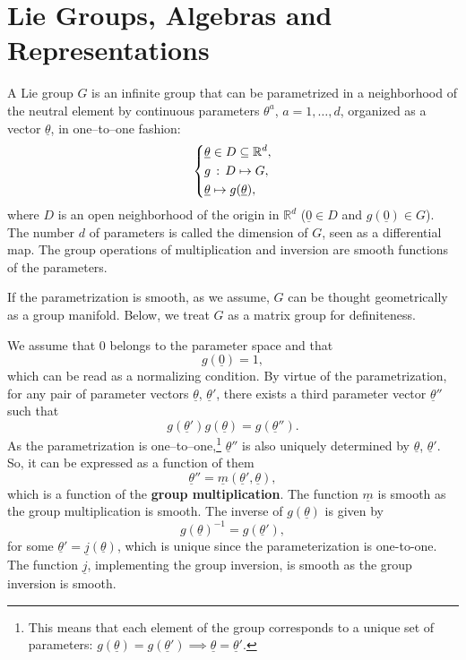 \chapter[Lie Groups, Algebras and Representations]{Lie Groups, Algebras and\\Representations} \label{sec:lie}

A Lie group \(G\) is an infinite group that can be parametrized in a neighborhood of the neutral element by continuous parameters \(\theta^a\), \(a = 1, \ldots, d\), organized as a vector \(\underline{\theta}\), in one–to–one fashion:
\[
    \begin{dcases}
        \underline{\theta} \in D \subseteq \mathbb{R}^d, \\
        g \, : \, D \mapsto G,                           \\
        \underline{\theta} \mapsto g(\underline{\theta}),
    \end{dcases}
\]
where \(D\) is an open neighborhood of the origin in \(\mathbb{R}^d\) (\(\underline{0}\in D\) and \(g(\underline{0}) \in G\)). The number \(d\) of parameters is called the dimension of \(G\), seen as a differential map. The group operations of multiplication and inversion are smooth functions of the parameters.

If the parametrization is smooth, as we assume, \(G\) can be thought geometrically as a group manifold. Below, we treat \(G\) as a matrix group for definiteness.

We assume that 0 belongs to the parameter space and that
\[
    g(\underline{0}) = 1,
\]
which can be read as a normalizing condition. By virtue of the parametrization, for any pair of parameter vectors \(\underline{\theta}\), \(\underline{\theta}'\), there exists a third parameter vector \(\underline{\theta}''\) such that
\[
    g(\underline{\theta}') g(\underline{\theta}) = g(\underline{\theta}'').
\]
As the parametrization is one–to–one,\footnote{This means that each element of the group corresponds to a unique set of parameters: \(g(\underline{\theta})=g(\underline{\theta}') \implies \underline{\theta} = \underline{\theta}'\).} \(\underline{\theta}''\) is also uniquely determined by \(\underline{\theta}\), \(\underline{\theta}'\).
So, it can be expressed as a function of them
\[
    \underline{\theta}'' = \underline{m}(\underline{\theta}', \underline{\theta}),
\]
which is a function of the \textbf{group multiplication}. The function \(\underline{m}\) is smooth as the group multiplication is smooth. The inverse of \(g(\underline{\theta})\) is given by
\[
    g(\underline{\theta})^{-1} = g(\underline{\theta}'),
\]
for some \(\underline{\theta}' = \underline{j}(\underline{\theta})\), which is unique since the parameterization is one-to-one. The function \(\underline{j}\), implementing the group inversion, is smooth as the group inversion is smooth.

